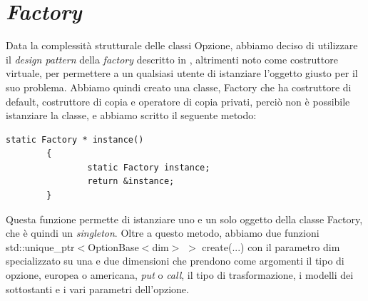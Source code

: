 \documentclass[a4paper,10pt]{report}
\theoremstyle{plain}
\theoremstyle{definition}
\theoremstyle{remark}
\begin{document}
\section{\emph{Factory}}
Data la complessit\`a strutturale delle classi Opzione, abbiamo deciso di utilizzare il \emph{design pattern} della \emph{factory} descritto in \cite{gamma1994design}, altrimenti noto come costruttore virtuale, per permettere a un qualsiasi utente di istanziare l'oggetto giusto per il suo problema. Abbiamo quindi creato una classe, \textsf{Factory} che ha costruttore di default, costruttore di copia e operatore di copia privati, perci\`o non \`e possibile istanziare la classe, e abbiamo scritto il seguente metodo:
\begin{lstlisting}
static Factory * instance()
        {
                static Factory instance;
                return &instance;
        }
\end{lstlisting}
Questa funzione permette di istanziare uno e un solo oggetto della classe \textsf{Factory}, che \`e quindi un \emph{singleton}. Oltre a questo metodo, abbiamo due funzioni \textsf{std::unique\_ptr$<$OptionBase$<$dim$>$ $>$ create(...)} con il parametro \textsf{dim} specializzato su una e due dimensioni che prendono come argomenti il tipo di opzione, europea o americana, \emph{put} o \emph{call}, il tipo di trasformazione, i modelli dei sottostanti e i vari parametri dell'opzione.
\end{document}
